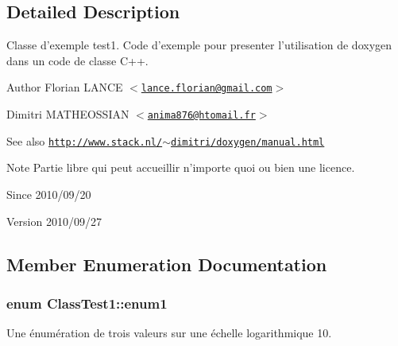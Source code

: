 \subsection{Detailed Description}
Classe d'exemple test1. Code d'exemple pour presenter l'utilisation de doxygen dans un code de classe C++. \begin{DoxyAuthor}{Author}
Florian LANCE $<$\href{mailto:lance.florian@gmail.com}{\tt lance.florian@gmail.com}$>$ 

Dimitri MATHEOSSIAN $<$\href{mailto:anima876@htomail.fr}{\tt anima876@htomail.fr}$>$ 
\end{DoxyAuthor}
\begin{DoxySeeAlso}{See also}
\href{http://www.stack.nl/~dimitri/doxygen/manual.html}{\tt http://www.stack.nl/$\sim$dimitri/doxygen/manual.html}
\end{DoxySeeAlso}
\begin{DoxyNote}{Note}
Partie libre qui peut accueillir n'importe quoi ou bien une licence.
\end{DoxyNote}
\begin{DoxySince}{Since}
2010/09/20 
\end{DoxySince}
\begin{DoxyVersion}{Version}
2010/09/27 
\end{DoxyVersion}


\subsection{Member Enumeration Documentation}
\hypertarget{class_class_test1_a5dc78bd1ea038f197d380c096fcb57b0}{
\subsubsection[{enum1}]{\setlength{\rightskip}{0pt plus 5cm}enum {\bf ClassTest1::enum1}}}
\label{class_class_test1_a5dc78bd1ea038f197d380c096fcb57b0}


Une énumération de trois valeurs sur une échelle logarithmique 10. 


